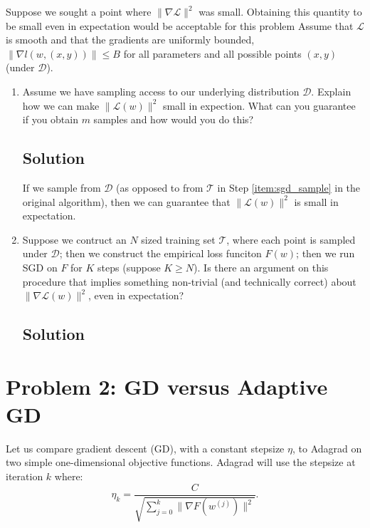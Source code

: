 \documentclass[letterpaper,11pt]{article}
\begin{document}
Suppose we sought a point where $\lVert \nabla \mathcal{L} \rVert^2$ was
small. Obtaining this quantity to be small even in expectation would be
acceptable for this problem Assume that $\mathcal{L}$ is smooth and that the
gradients are uniformly bounded,
$\lVert \nabla l\left(w, (x,y)\right)\rVert \leq B$ for all parameters and all
possible points $(x,y)$ (under $\mathcal{D}$).

\begin{enumerate}
\item 
  Assume we have sampling access to our underlying distribution
  $\mathcal{D}$. Explain how we can make $\lVert \mathcal{L}(w) \rVert^2$ small
  in expection. What can you guarantee if you obtain $m$ samples and how would
  you do this?

  \subsection*{Solution}

  If we sample from $\mathcal{D}$ (as opposed to from $\mathcal{T}$ in Step
  \ref{item:sgd_sample} in the original algorithm), then we can guarantee that
  $\lVert \mathcal{L}(w) \rVert^2$ is small in expectation.

  

\item Suppose we contruct an $N$ sized training set $\mathcal{T}$, where each
  point is sampled under $\mathcal{D}$; then we construct the empirical loss
  funciton $F(w)$; then we run SGD on $F$ for $K$ steps (suppose $K \geq N$). Is
  there an argument on this procedure that implies something non-trivial (and
  technically correct) about $\lVert \nabla\mathcal{L}(w)\rVert^2$, even in
  expectation?

  \subsection*{Solution}
\end{enumerate}

\section*{Problem 2: GD versus Adaptive GD}

Let us compare gradient descent (GD), with a constant stepsize $\eta$, to
Adagrad on two simple one-dimensional objective functions. Adagrad will use the
stepsize at iteration $k$ where:
\begin{equation}
  \eta_k = \frac{C}{\sqrt{\sum_{j = 0}^k \lVert \nabla F \left(
        w^{(j)}
      \right)\rVert^2}}.
\end{equation}
\end{document}
